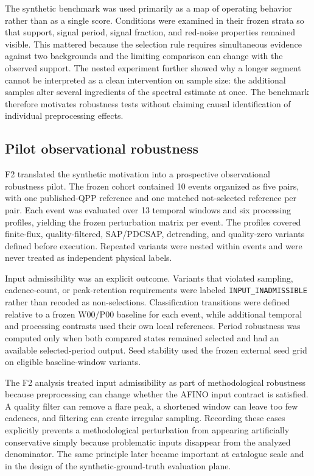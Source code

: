 \documentclass[11pt,a4paper]{article}
\begin{document}
The synthetic benchmark was used primarily as a map of operating behavior rather than as a single score. Conditions were examined in their frozen strata so that support, signal period, signal fraction, and red-noise properties remained visible. This mattered because the selection rule requires simultaneous evidence against two backgrounds and the limiting comparison can change with the observed support. The nested experiment further showed why a longer segment cannot be interpreted as a clean intervention on sample size: the additional samples alter several ingredients of the spectral estimate at once. The benchmark therefore motivates robustness tests without claiming causal identification of individual preprocessing effects.

\subsection{Pilot observational robustness}
F2 translated the synthetic motivation into a prospective observational robustness pilot. The frozen cohort contained 10 events organized as five pairs, with one published-QPP reference and one matched not-selected reference per pair. Each event was evaluated over 13 temporal windows and six processing profiles, yielding the frozen perturbation matrix per event. The profiles covered finite-flux, quality-filtered, SAP/PDCSAP, detrending, and quality-zero variants defined before execution. Repeated variants were nested within events and were never treated as independent physical labels.

Input admissibility was an explicit outcome. Variants that violated sampling, cadence-count, or peak-retention requirements were labeled \texttt{INPUT\_INADMISSIBLE} rather than recoded as non-selections. Classification transitions were defined relative to a frozen W00/P00 baseline for each event, while additional temporal and processing contrasts used their own local references. Period robustness was computed only when both compared states remained selected and had an available selected-period output. Seed stability used the frozen external seed grid on eligible baseline-window variants.

The F2 analysis treated input admissibility as part of methodological robustness because preprocessing can change whether the AFINO input contract is satisfied. A quality filter can remove a flare peak, a shortened window can leave too few cadences, and filtering can create irregular sampling. Recording these cases explicitly prevents a methodological perturbation from appearing artificially conservative simply because problematic inputs disappear from the analyzed denominator. The same principle later became important at catalogue scale and in the design of the synthetic-ground-truth evaluation plane.
\end{document}
